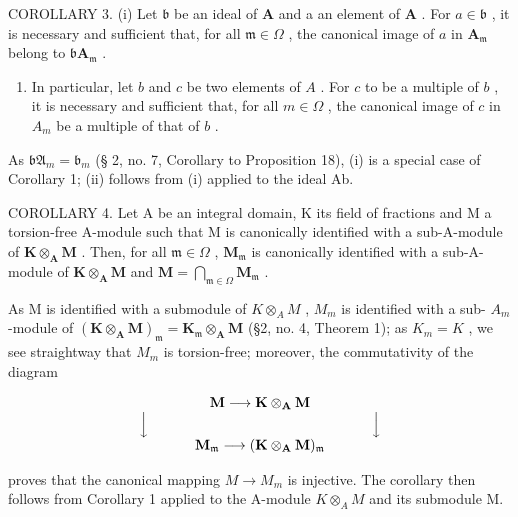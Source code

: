 COROLLARY 3. (i) Let \(\mathfrak{b}\) be an ideal of \(\mathbf{A}\) and a an element of \(\mathbf{A}\) . For \(a \in \mathfrak{b}\) , it is necessary and sufficient that, for all \(\mathfrak{m} \in \Omega\) , the canonical image of \(a\) in \(\mathbf{A}_{\mathfrak{m}}\) belong to \(\mathfrak{b}\mathbf{A}_{\mathfrak{m}}\) .

\begin{enumerate}
\def\labelenumi{(\roman{enumi})}
\setcounter{enumi}{1}
\tightlist
\item
  In particular, let \(b\) and \(c\) be two elements of \(A\) . For \(c\) to be a multiple of \(b\) , it is necessary and sufficient that, for all \(m \in \Omega\) , the canonical image of \(c\) in \(A_m\) be a multiple of that of \(b\) .
\end{enumerate}

As \(\mathfrak{bA}_{m} = \mathfrak{b}_{m}\) (§ 2, no. 7, Corollary to Proposition 18), (i) is a special case of Corollary 1; (ii) follows from (i) applied to the ideal Ab.

COROLLARY 4. Let A be an integral domain, K its field of fractions and M a torsion-free A-module such that M is canonically identified with a sub-A-module of \(\mathbf{K} \otimes_{\mathbf{A}} \mathbf{M}\) . Then, for all \(\mathfrak{m} \in \Omega\) , \(\mathbf{M}_{\mathfrak{m}}\) is canonically identified with a sub-A-module of \(\mathbf{K} \otimes_{\mathbf{A}} \mathbf{M}\) and \(\mathbf{M} = \bigcap_{\mathfrak{m} \in \Omega} \mathbf{M}_{\mathfrak{m}}\) .

As M is identified with a submodule of \(K \otimes_{A} M\) , \(M_{m}\) is identified with a sub- \(A_{m}\) -module of \((\mathbf{K} \otimes_{\mathbf{A}} \mathbf{M})_{\mathfrak{m}} = \mathbf{K}_{\mathfrak{m}} \otimes_{\mathbf{A}} \mathbf{M}\) (§2, no. 4, Theorem 1); as \(K_{m} = K\) , we see straightway that \(M_{m}\) is torsion-free; moreover, the commutativity of the diagram

\[
\begin{array}{c} \mathbf {M} \longrightarrow \mathbf {K} \otimes_ {\mathbf {A}} \mathbf {M} \\ \Big \downarrow \qquad \qquad \qquad \qquad \qquad \qquad \qquad \qquad \Big \downarrow \\ \mathbf {M} _ {\mathfrak {m}} \longrightarrow (\mathbf {K} \otimes_ {\mathbf {A}} \mathbf {M}) _ {\mathfrak {m}} \end{array}
\]

proves that the canonical mapping \(M \rightarrow M_{m}\) is injective. The corollary then follows from Corollary 1 applied to the A-module \(K \otimes_{A} M\) and its submodule M.

